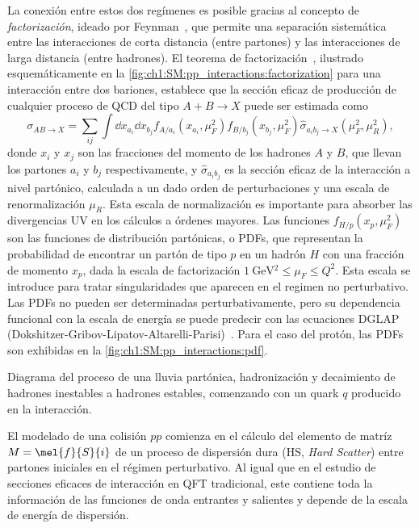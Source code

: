 La conexión entre estos dos regímenes es posible gracias al concepto de \textit{factorización}, ideado por Feynman~\cite{Feynman1969}, que permite una separación sistemática entre las interacciones de corta distancia (entre partones) y las interacciones de larga distancia (entre hadrones). El teorema de factorización~\cite{Collins1989}, ilustrado esquemáticamente en la \cref{fig:ch1:SM:pp_interactions:factorization} para una interacción entre dos bariones, establece que la sección eficaz de producción de cualquier proceso de QCD del tipo $A + B \to X$ puede ser estimada como
\begin{equation}
  \sigma_{AB \to X} = \sum_{ij} \int \dd{x_{a_i}} \dd{x_{b_j}} f_{A/a_i}(x_{a_i}, \mu_F^2) f_{B/b_j}(x_{b_j}, \mu_F^2) \hat{\sigma}_{a_i b_j \to X}(\mu_F^2, \mu_R^2), \label{eq:ch1:SM:factorization}
\end{equation}
donde $x_i$ y $x_j$ son las fracciones del momento de los hadrones $A$ y $B$, que llevan los partones $a_i$ y $b_j$ respectivamente, y $\hat{\sigma}_{a_i b_j}$ es la sección eficaz de la interacción a nivel partónico, calculada a un dado orden de perturbaciones y una escala de renormalización $\mu_R$. Esta escala de normalización es importante para absorber las divergencias UV en los cálculos a órdenes mayores. Las funciones $f_{H/p}(x_p,\mu_F^2)$ son las funciones de distribución partónicas, o PDFs, que representan la probabilidad de encontrar un partón de tipo $p$ en un hadrón $H$ con una fracción de momento $x_p$, dada la escala de factorización $\SI{1}{\GeV^2} \leq \mu_F \leq Q^2$. Esta escala se introduce para tratar singularidades que aparecen en el regimen no perturbativo. Las PDFs no pueden ser determinadas perturbativamente, pero su dependencia funcional con la escala de energía se puede predecir con las ecuaciones DGLAP (Dokshitzer-Gribov-Lipatov-Altarelli-Parisi)~. Para el caso del protón, las PDFs son exhibidas en la \cref{fig:ch1:SM:pp_interactions:pdf}.

\begin{marginfigure}[2em]
  \centering
  
  \caption{Diagrama del proceso de una lluvia partónica, hadronización y decaimiento de hadrones inestables a hadrones estables, comenzando con un quark $q$ producido en la interacción.}
  \label{fig:ch1:SM:pp_interactions:hadron_production}
\end{marginfigure}

El modelado de una colisión $pp$ comienza en el cálculo del elemento de matríz $M = \mel{f}{S}{i}$ de un proceso de dispersión dura (HS, \textit{Hard Scatter}) entre partones iniciales en el régimen perturbativo. Al igual que en el estudio de secciones eficaces de interacción en QFT tradicional, este contiene toda la información de las funciones de onda entrantes y salientes y depende de la escala de energía de dispersión.

